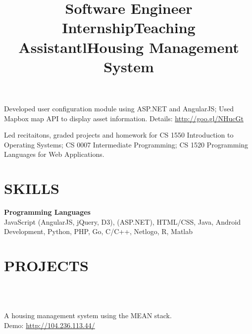 \begin{resume}
\title{\textbf{Software Engineer Internship}}
\begin{position}
	Developed user configuration module using ASP.NET and AngularJS; Used Mapbox map API to display asset information.
	Details: \url{http://goo.gl/NHucGt}
\end{position}


\title{\textbf{Teaching Assistant}}
\begin{position}
	Led recitaitons, graded projects and homework for CS 1550 Introduction to Operating Systems; CS 0007 Intermediate Programming; CS 1520 Programming Languages for Web Applications.
\end{position}



\section{\textsc{SKILLS}}

\textbf{Programming Languages}\\
JavaScript (AngularJS, jQuery, D3), \CSharp (ASP.NET), HTML/CSS,
Java, Android Development, Python, PHP, Go, C/C++, Netlogo, R, Matlab


\section{\textsc{PROJECTS}}
\begin{formatb}
  \title{l}\\
   \body\\
\end{formatb}

\title{\textbf{Housing Management System}}
\begin{position}
	A housing management system using the MEAN stack.\\
	Demo: \url{http://104.236.113.44/}
\end{position}


\end{resume}
